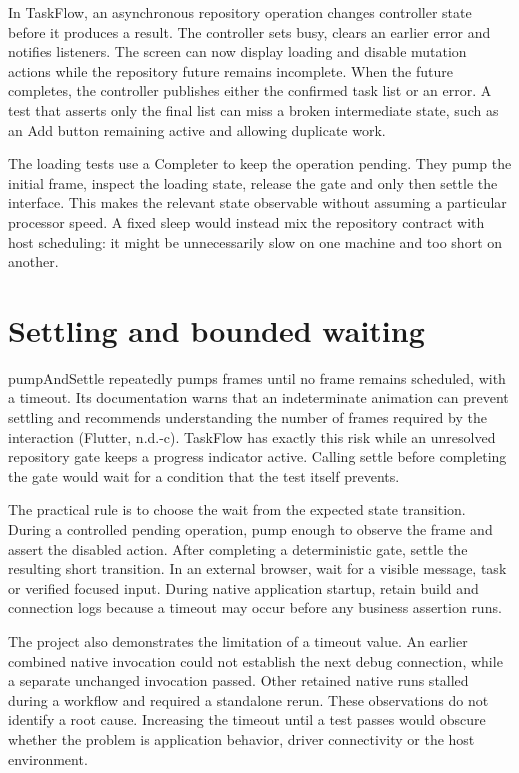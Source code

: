 \documentclass[12pt,a4paper,oneside]{report}
\begin{document}
In TaskFlow, an asynchronous repository operation changes controller state before it produces a result. The controller sets busy, clears an earlier error and notifies listeners. The screen can now display loading and disable mutation actions while the repository future remains incomplete. When the future completes, the controller publishes either the confirmed task list or an error. A test that asserts only the final list can miss a broken intermediate state, such as an Add button remaining active and allowing duplicate work.

The loading tests use a Completer to keep the operation pending. They pump the initial frame, inspect the loading state, release the gate and only then settle the interface. This makes the relevant state observable without assuming a particular processor speed. A fixed sleep would instead mix the repository contract with host scheduling: it might be unnecessarily slow on one machine and too short on another.

\section{Settling and bounded waiting}
pumpAndSettle repeatedly pumps frames until no frame remains scheduled, with a timeout. Its documentation warns that an indeterminate animation can prevent settling and recommends understanding the number of frames required by the interaction (Flutter, n.d.-c). TaskFlow has exactly this risk while an unresolved repository gate keeps a progress indicator active. Calling settle before completing the gate would wait for a condition that the test itself prevents.

The practical rule is to choose the wait from the expected state transition. During a controlled pending operation, pump enough to observe the frame and assert the disabled action. After completing a deterministic gate, settle the resulting short transition. In an external browser, wait for a visible message, task or verified focused input. During native application startup, retain build and connection logs because a timeout may occur before any business assertion runs.

The project also demonstrates the limitation of a timeout value. An earlier combined native invocation could not establish the next debug connection, while a separate unchanged invocation passed. Other retained native runs stalled during a workflow and required a standalone rerun. These observations do not identify a root cause. Increasing the timeout until a test passes would obscure whether the problem is application behavior, driver connectivity or the host environment.
\end{document}

